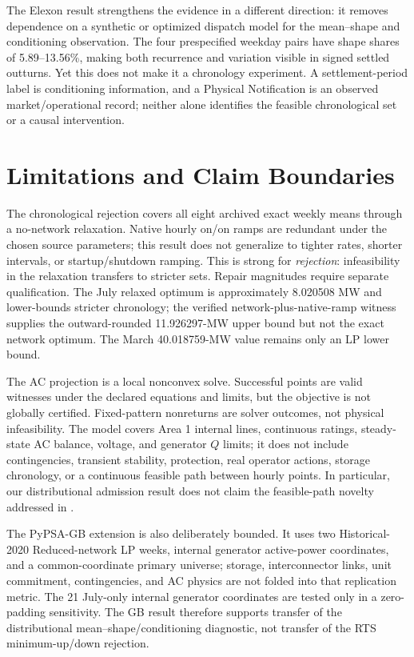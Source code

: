 \documentclass[journal]{IEEEtran}
\begin{document}
The Elexon result strengthens the evidence in a different direction: it removes dependence on a synthetic or optimized dispatch model for the mean--shape and conditioning observation. The four prespecified weekday pairs have shape shares of 5.89--13.56\%, making both recurrence and variation visible in signed settled outturns. Yet this does not make it a chronology experiment. A settlement-period label is conditioning information, and a Physical Notification is an observed market/operational record; neither alone identifies the feasible chronological set or a causal intervention.

\section{Limitations and Claim Boundaries}
The chronological rejection covers all eight archived exact weekly means through a no-network relaxation. Native hourly on/on ramps are redundant under the chosen source parameters; this result does not generalize to tighter rates, shorter intervals, or startup/shutdown ramping. This is strong for \emph{rejection}: infeasibility in the relaxation transfers to stricter sets. Repair magnitudes require separate qualification. The July relaxed optimum is approximately 8.020508 MW and lower-bounds stricter chronology; the verified network-plus-native-ramp witness supplies the outward-rounded 11.926297-MW upper bound but not the exact network optimum. The March 40.018759-MW value remains only an LP lower bound.

The AC projection is a local nonconvex solve. Successful points are valid witnesses under the declared equations and limits, but the objective is not globally certified. Fixed-pattern nonreturns are solver outcomes, not physical infeasibility. The model covers Area 1 internal lines, continuous ratings, steady-state AC balance, voltage, and generator $Q$ limits; it does not include contingencies, transient stability, protection, real operator actions, storage chronology, or a continuous feasible path between hourly points. In particular, our distributional admission result does not claim the feasible-path novelty addressed in \cite{LeePath2020,Narimani2025}.

The PyPSA-GB extension is also deliberately bounded. It uses two Historical-2020 Reduced-network LP weeks, internal generator active-power coordinates, and a common-coordinate primary universe; storage, interconnector links, unit commitment, contingencies, and AC physics are not folded into that replication metric. The 21 July-only internal generator coordinates are tested only in a zero-padding sensitivity. The GB result therefore supports transfer of the distributional mean--shape/conditioning diagnostic, not transfer of the RTS minimum-up/down rejection.
\end{document}
